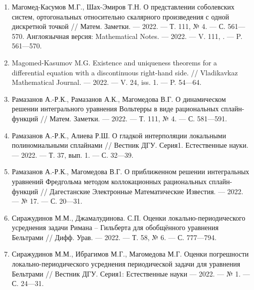 \begin{enumerate}[1]

    \item
    Магомед-Касумов М.Г., Шах-Эмиров Т.Н.
    О представлении соболевских систем, ортогональных относительно скалярного произведения с одной дискретной точкой
    //
    Матем. Заметки.
    --- 2022.
    --- Т. 111, № 4.
    --- С. 561---570.
    Англоязычная версия:
    Mathematical Notes.
    --- 2022.
    --- V. 111, .
    --- P. 561---570.

    \item
    Magomed-Kasumov M.G.
    Existence and uniqueness theorems for a differential equation with a discontinuous right-hand side.
    //
    Vladikavkaz Mathematical Journal.
    --- 2022.
    --- V. 24, iss. 1.
    --- P. 54---64.



    \item
    Рамазанов А.-Р.К., Рамазанов А.К., Магомедова В.Г.
    О динамическом решении интегрального уравнения Вольтерры в виде рациональных сплайн-функций
    //
    Матем. Заметки.
    --- 2022.
    --- Т. 111, № 4.
    --- С. 581---591.

    \item
    Рамазанов А.-Р.К., Алиева Р.Ш.
    О гладкой интерполяции локальными полиномиальными сплайнами
    //
    Вестник ДГУ. Серия1. Естественные науки.
    --- 2022.
    --- Т. 37, вып. 1.
    --- С. 32---39.

    \item
    Рамазанов А.-Р.К., Магомедова В.Г.
    О приближенном решении интегральных уравнений Фредгольма методом коллокационных рациональных сплайн-функций
    //
    Дагестанские Электронные Математические Известия.
    --- 2022.
    --- № 17.
    --- С. 20---31.



    \item
    Сиражудинов М.М., Джамалудинова. С.П.
    Оценки локально-периодического усреднения задачи Римана – Гильберта для обобщённого уравнения Бельтрами
    //
    Дифф. Урав.
    --- 2022.
    --- Т. 58, № 6.
    --- С. 777---794.

    \item
    Сиражудинов М.М., Ибрагимов М.Г., Магомедова М.Г.
    Оценки погрешности локально-периодического усреднения периодической задачи для уравнения Бельтрами
    //
    Вестник ДГУ. Серия1: Естественные науки
    --- 2022.
    --- № 1.
    --- С. 24---31.




\end{enumerate}

